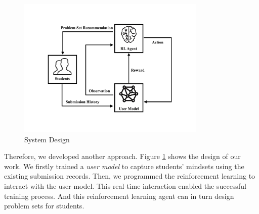     \begin{figure}[!htp]
        \centering
        \includegraphics[width=0.8\textwidth]{img/system-design.pdf}
        \caption{System Design}
        \label{fig:system-design}
    \end{figure}

    Therefore, we developed another approach.
    Figure \ref{fig:system-design} shows the design of our work.
    We firstly trained a \emph{user model} to capture students' mindsets using the existing submission records.
    Then, we programmed the reinforcement learning to interact with the user model.
    This real-time interaction enabled the successful training process.
    And this reinforcement learning agent can in turn design problem sets for students.



















